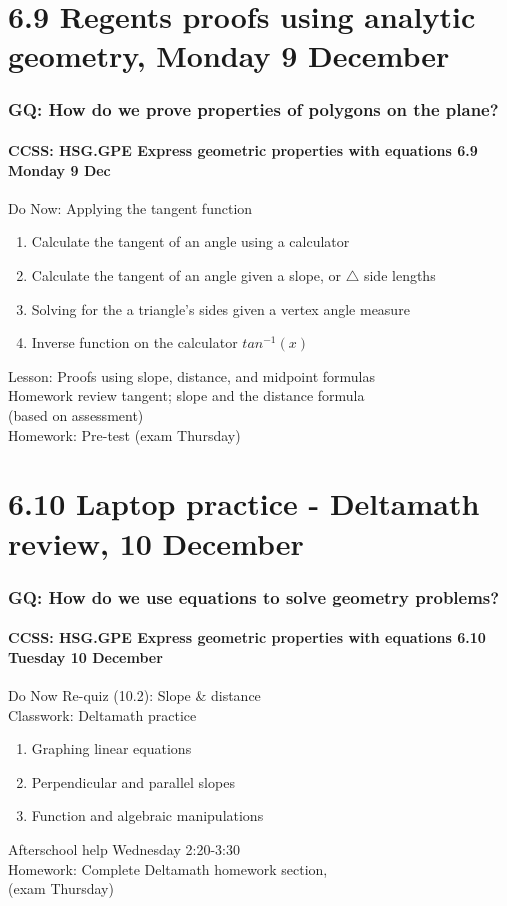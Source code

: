 \documentclass{beamer}
\begin{document}
\section{6.9 Regents proofs using analytic geometry, Monday 9 December}
\frame
{
  \frametitle{GQ: How do we prove properties of polygons on the plane?}
  \framesubtitle{CCSS: HSG.GPE Express geometric properties with equations \hfill \alert{6.9 Monday 9 Dec}}

  \begin{block}{Do Now: Applying the tangent function}
  \begin{enumerate}
    \item Calculate the tangent of an angle using a calculator
    \item Calculate the tangent of an angle given a slope, or $\triangle$ side lengths
    \item Solving for the a triangle's sides given a vertex angle measure
    \item Inverse function on the calculator $tan^{-1}(x)$
  \end{enumerate}
  \end{block}
  Lesson: Proofs using slope, distance, and midpoint formulas \\
  Homework review tangent; slope and the distance formula \\(based on assessment)\\[0.25cm]
  Homework: Pre-test (\alert{exam Thursday})
}

\section{6.10 Laptop practice - Deltamath review, 10 December}
  \frame
  {
  \frametitle{GQ: How do we use equations to solve geometry problems?}
  \framesubtitle{CCSS: HSG.GPE Express geometric properties with equations \hfill \alert{6.10 Tuesday 10 December}}

  \begin{block}{Do Now Re-quiz (10.2): Slope \& distance \\[0.25cm] 
    Classwork: Deltamath practice}
  \begin{enumerate}
    \item Graphing linear equations
    \item Perpendicular and parallel slopes
    \item Function and algebraic manipulations
  \end{enumerate}
  \end{block}
  Afterschool help Wednesday 2:20-3:30\\[0.25cm]
  Homework: Complete Deltamath homework section, \\(\alert{exam Thursday})
  }
\end{document}
